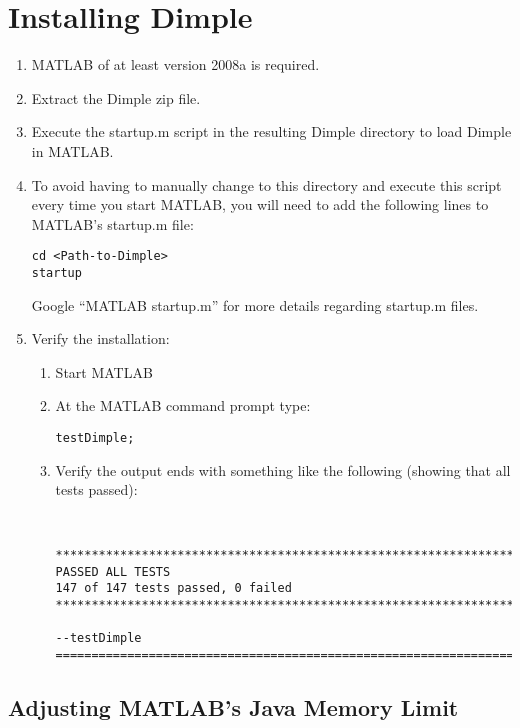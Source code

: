 \section{Installing Dimple}

\begin{enumerate}
\item MATLAB of at least version 2008a is required. 
\item Extract the Dimple zip file.
\item Execute the startup.m script in the resulting Dimple directory to 
load Dimple in MATLAB.
\item To avoid having to manually change to this directory and execute 
this script every time you start MATLAB, you will need to add the following lines to MATLAB's startup.m file:
\begin{lstlisting}
cd <Path-to-Dimple>
startup
\end{lstlisting}
Google ``MATLAB startup.m'' for more details regarding startup.m files.
\item Verify the installation:
\begin{enumerate}
\item Start MATLAB
\item  At the MATLAB command prompt type:
\begin{lstlisting} 
testDimple;
\end{lstlisting}
\item Verify the output ends with something like the following (showing that all tests passed): \\
\begin{minipage}{\textwidth}
\begin{lstlisting} 


**********************************************************************
PASSED ALL TESTS
147 of 147 tests passed, 0 failed
**********************************************************************

--testDimple
======================================================================
\end{lstlisting}
\end{minipage}

\end{enumerate}
\end{enumerate}


\subsection{Adjusting MATLAB's Java Memory Limit}

